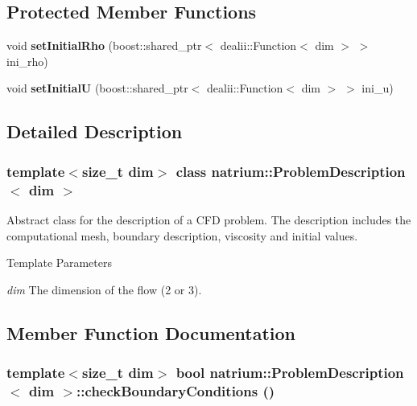 \subsection*{Protected Member Functions}
\begin{DoxyCompactItemize}
\item 
\hypertarget{classnatrium_1_1ProblemDescription_a3b1f71cc4ec46691a29478049d851c8d}{
void {\bfseries setInitialRho} (boost::shared\_\-ptr$<$ dealii::Function$<$ dim $>$ $>$ ini\_\-rho)}
\label{classnatrium_1_1ProblemDescription_a3b1f71cc4ec46691a29478049d851c8d}

\item 
\hypertarget{classnatrium_1_1ProblemDescription_a1e173a98aaf7233b9b9e849b5d1f9efb}{
void {\bfseries setInitialU} (boost::shared\_\-ptr$<$ dealii::Function$<$ dim $>$ $>$ ini\_\-u)}
\label{classnatrium_1_1ProblemDescription_a1e173a98aaf7233b9b9e849b5d1f9efb}

\end{DoxyCompactItemize}


\subsection{Detailed Description}
\subsubsection*{template$<$size\_\-t dim$>$ class natrium::ProblemDescription$<$ dim $>$}

Abstract class for the description of a CFD problem. The description includes the computational mesh, boundary description, viscosity and initial values. 
\begin{DoxyTemplParams}{Template Parameters}
\item[{\em dim}]The dimension of the flow (2 or 3). \end{DoxyTemplParams}


\subsection{Member Function Documentation}
\hypertarget{classnatrium_1_1ProblemDescription_aed8ec93fcba6c0b78c04ef91b8703f7a}{
\subsubsection[{checkBoundaryConditions}]{\setlength{\rightskip}{0pt plus 5cm}template$<$size\_\-t dim$>$ bool {\bf natrium::ProblemDescription}$<$ dim $>$::checkBoundaryConditions ()}}
\label{classnatrium_1_1ProblemDescription_aed8ec93fcba6c0b78c04ef91b8703f7a}


